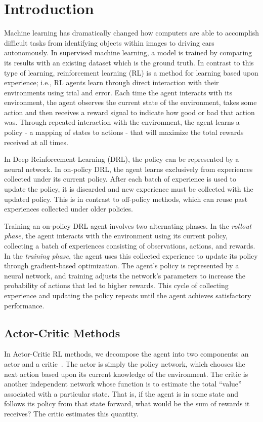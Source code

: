 \chapter{Introduction}

Machine learning has dramatically changed how computers are able to accomplish difficult tasks from identifying objects within images to driving cars autonomously. 
In supervised machine learning, a model is trained by comparing its results with an existing dataset which is the ground truth. 
In contrast to this type of learning, reinforcement learning (RL) is a method for learning based upon experience; i.e., RL agents learn through direct interaction with their environments using trial and error. 
Each time the agent interacts with its environment, the agent observes the current state of the environment, takes some action and then receives a reward signal to indicate how good or bad that action was. 
Through repeated interaction with the environment, the agent learns a policy - a mapping of states to actions - that will maximize the total rewards received at all times.

In Deep Reinforcement Learning (DRL), the policy can be represented by a neural network. In on-policy DRL, the agent learns exclusively from experiences collected under its current policy. After each batch of experience is used to update the policy, it is discarded and new experience must be collected with the updated policy. This is in contrast to off-policy methods, which can reuse past experiences collected under older policies.

Training an on-policy DRL agent involves two alternating phases. In the \emph{rollout phase}, the agent interacts with the environment using its current policy, collecting a batch of experiences consisting of observations, actions, and rewards. In the \emph{training phase}, the agent uses this collected experience to update its policy through gradient-based optimization. The agent's policy is represented by a neural network, and training adjusts the network's parameters to increase the probability of actions that led to higher rewards. This cycle of collecting experience and updating the policy repeats until the agent achieves satisfactory performance.

\section{Actor-Critic Methods}

In Actor-Critic RL methods, we decompose the agent into two components: an actor and a critic~\cite{konda1999}. The actor is simply the policy network, which chooses the next action based upon its current knowledge of the environment. The critic is another independent network whose function is to estimate the total ``value'' associated with a particular state. That is, if the agent is in some state and follows its policy from that state forward, what would be the sum of rewards it receives? The critic estimates this quantity.

